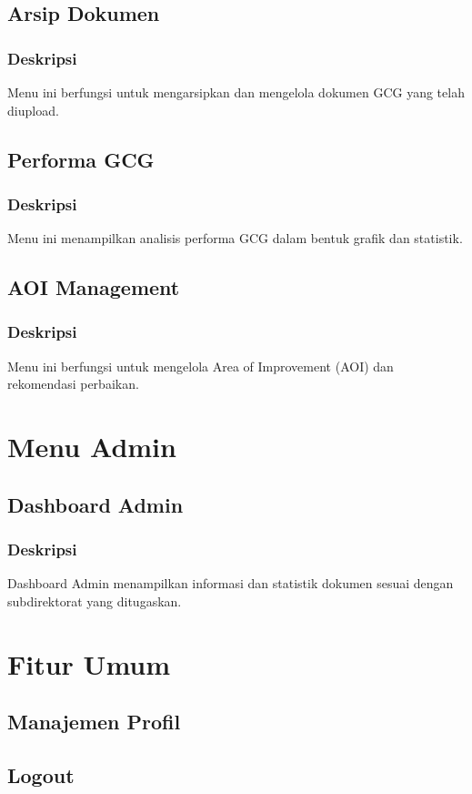 \documentclass[12pt,a4paper]{article}
\begin{document}
\subsection{Arsip Dokumen}
\subsubsection{Deskripsi}
Menu ini berfungsi untuk mengarsipkan dan mengelola dokumen GCG yang telah diupload.

\subsection{Performa GCG}
\subsubsection{Deskripsi}
Menu ini menampilkan analisis performa GCG dalam bentuk grafik dan statistik.

\subsection{AOI Management}
\subsubsection{Deskripsi}
Menu ini berfungsi untuk mengelola Area of Improvement (AOI) dan rekomendasi perbaikan.

\section{Menu Admin}
\subsection{Dashboard Admin}
\subsubsection{Deskripsi}
Dashboard Admin menampilkan informasi dan statistik dokumen sesuai dengan subdirektorat yang ditugaskan.

\section{Fitur Umum}
\subsection{Manajemen Profil}
\subsection{Logout}
\end{document}
